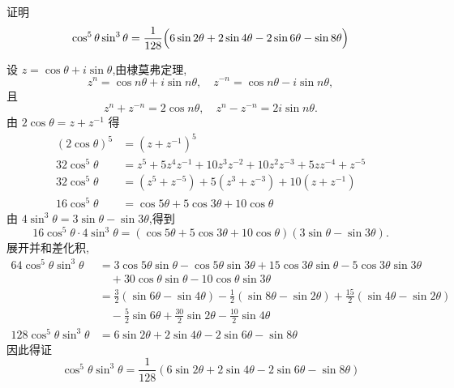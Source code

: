 \begin{questions}
    \question 证明
    \[
    \cos^5\theta \sin^3\theta = \frac{1}{128}\Bigl(6\sin 2\theta + 2\sin 4\theta - 2\sin 6\theta - \sin 8\theta\Bigr)
    \]
    \begin{solution}
        设 $z = \cos\theta + i \sin\theta$,由棣莫弗定理,
        \[
        z^n = \cos n\theta + i\sin n\theta, \quad z^{-n} = \cos n\theta - i\sin n\theta,
        \]
        且
        \[
        z^n + z^{-n} = 2\cos n\theta, \quad z^n - z^{-n} = 2i \sin n\theta.
        \]
        由 $2\cos\theta = z + z^{-1}$ 得
        \begin{align*}
        (2\cos\theta)^5 &= (z + z^{-1})^5 \\
        32 \cos^5\theta &= z^5 + 5 z^4 z^{-1} + 10 z^3 z^{-2} + 10 z^2 z^{-3} + 5 z z^{-4} + z^{-5} \\
        32 \cos^5\theta &= (z^5 + z^{-5}) + 5(z^3 + z^{-3}) + 10(z + z^{-1}) \\
        16 \cos^5\theta &= \cos 5\theta + 5\cos 3\theta + 10\cos\theta
        \end{align*}
        由 $4\sin^3\theta = 3\sin\theta - \sin 3\theta$,得到
        \[
        16\cos^5\theta \cdot 4 \sin^3\theta = (\cos 5\theta + 5\cos 3\theta + 10\cos\theta)(3\sin\theta - \sin 3\theta).
        \]
        展开并和差化积,
        \begin{align*}
        64 \cos^5\theta \sin^3\theta &= 3\cos 5\theta \sin\theta - \cos 5\theta \sin 3\theta + 15 \cos 3\theta \sin\theta - 5 \cos 3\theta \sin 3\theta \\
        &\quad + 30 \cos\theta \sin\theta - 10 \cos\theta \sin 3\theta \\
        &= \frac{3}{2}(\sin 6\theta - \sin 4\theta) - \frac{1}{2}(\sin 8\theta - \sin 2\theta) + \frac{15}{2}(\sin 4\theta - \sin 2\theta) \\
        &\quad - \frac{5}{2} \sin 6\theta + \frac{30}{2} \sin 2\theta - \frac{10}{2} \sin 4\theta \\
        128 \cos^5\theta \sin^3\theta &= 6 \sin 2\theta + 2 \sin 4\theta - 2 \sin 6\theta - \sin 8\theta
        \end{align*}
        因此得证
        \[
        \cos^5\theta \sin^3\theta = \frac{1}{128}\left(6\sin 2\theta + 2\sin 4\theta - 2\sin 6\theta - \sin 8\theta\right)
        \]
    \end{solution}


\end{questions}
